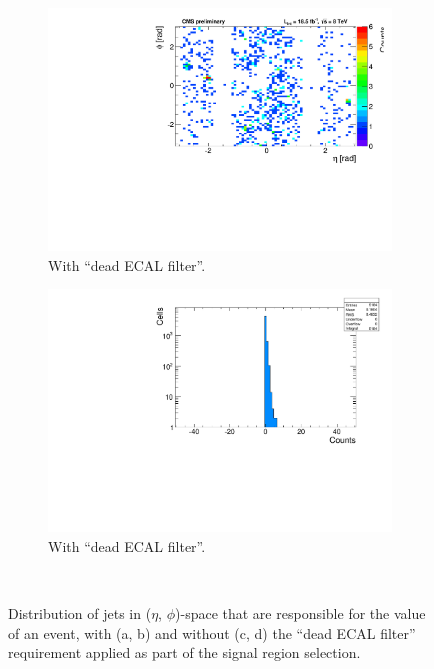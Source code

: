 \begin{figure}[h!]
\begin{center}
    \begin{subfigure}[b]{0.46\textwidth}
      \includegraphics[width=\textwidth]{Figs/dphi/Nominal_AlphaT_thresholds/th2d_numer_summed_ge2j_ge0b_200.pdf}
      \caption{With ``dead ECAL filter''.}
      \label{fig:hotspots_2d_withdeadECAL}
    \end{subfigure}
    \begin{subfigure}[b]{0.46\textwidth}
      \includegraphics[width=\textwidth]{Figs/dphi/Nominal_AlphaT_thresholds/th1d_numer_summed_ge2j_ge0b_200.pdf}
      \caption{With ``dead ECAL filter''.}
      \label{fig:hotspots_1d_withdeadECAL}
    \end{subfigure} \\ 
    \caption{Distribution of jets in ($\eta$, $\phi$)-space that are
      responsible for the \mindphistar value of an event, with (a, b) and
      without (c, d) the ``dead ECAL filter''
      requirement applied as part of the signal region selection.}
    \label{fig:hotspots}
  \end{center}
\end{figure}

